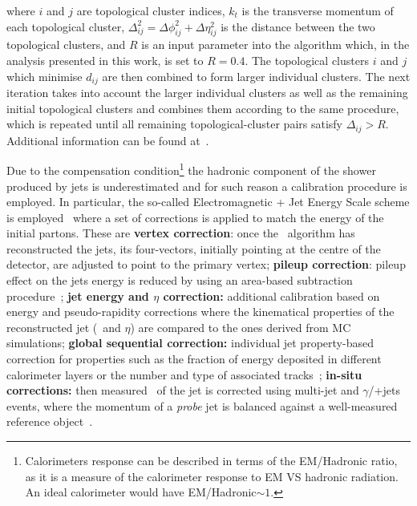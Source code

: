 				\noindent where $i$ and $j$ are topological cluster indices, $k_t$ is the transverse momentum of each topological cluster, $\Delta_{ij}^2 = \Delta \phi_{ij}^2 + \Delta \eta_{ij}^2 $ is the distance between the two topological clusters, and $R$ is an input parameter into the algorithm which, in the analysis presented in this work, is set to $R = 0.4$. The topological clusters $i$ and $j$ which minimise $d_{ij}$ are then combined to form larger individual clusters. The next iteration takes into account the larger individual clusters as well as the remaining initial topological clusters and combines them according to the same procedure, which is repeated until all remaining topological-cluster pairs satisfy $\Delta_{ij}> R$. Additional information can be found at~\cite{Antikt2008}.


				Due to the compensation condition\footnote{Calorimeters response can be described in terms of the \ac{EM}/Hadronic ratio, as it is a measure of the calorimeter response to \ac{EM} VS hadronic radiation. An ideal calorimeter would have \ac{EM}/Hadronic$\sim1$.} the hadronic component of the shower produced by jets is underestimated and for such reason a calibration procedure is employed. In particular, the so-called Electromagnetic + Jet Energy Scale scheme is employed~\cite{ATL-PHYS-PUB-2015-015} where a set of corrections is applied to match the energy of the initial partons. These are \textbf{vertex correction}: once the \antikt\ algorithm has reconstructed the jets, its four-vectors, initially pointing at the centre of the detector, are adjusted to point to the primary vertex; \textbf{pileup correction}: pileup effect on the jets energy is reduced by using an area-based subtraction procedure~\cite{TheATLAScollaboration:2013pia}; \textbf{jet energy and $\eta$ correction:} additional calibration based on energy and pseudo-rapidity corrections where the kinematical properties of the reconstructed jet (\pt\ and $\eta$) are compared to the ones derived from \ac{MC} simulations; \textbf{global sequential correction:} individual jet property-based correction for properties such as the fraction of energy deposited in different calorimeter layers or the number and type of associated tracks~\cite{ATLAS:2015oia}; \textbf{in-situ corrections:} then measured \pt\ of the jet is corrected using multi-jet and $\gamma$/\Zboson+jets events, where the momentum of a \emph{probe} jet is balanced against a well-measured reference object~\cite{ATLAS-CONF-2015-017}.

